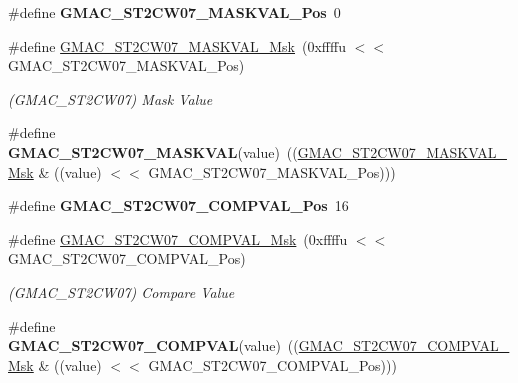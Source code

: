 \begin{DoxyCompactItemize}
\#define {\bfseries G\+M\+A\+C\+\_\+\+S\+T2\+C\+W07\+\_\+\+M\+A\+S\+K\+V\+A\+L\+\_\+\+Pos}~0
\item 
\mbox{\label{group__SAME70__GMAC_gaec7a742926e8d771dfb359cfc38959a0}} 
\#define \mbox{\hyperlink{group__SAME70__GMAC_gaec7a742926e8d771dfb359cfc38959a0}{G\+M\+A\+C\+\_\+\+S\+T2\+C\+W07\+\_\+\+M\+A\+S\+K\+V\+A\+L\+\_\+\+Msk}}~(0xffffu $<$$<$ G\+M\+A\+C\+\_\+\+S\+T2\+C\+W07\+\_\+\+M\+A\+S\+K\+V\+A\+L\+\_\+\+Pos)
\begin{DoxyCompactList}\small\item\em (G\+M\+A\+C\+\_\+\+S\+T2\+C\+W07) Mask Value \end{DoxyCompactList}\item 
\mbox{\label{group__SAME70__GMAC_ga1876c09ee0d84aaad328224e94017d7c}} 
\#define {\bfseries G\+M\+A\+C\+\_\+\+S\+T2\+C\+W07\+\_\+\+M\+A\+S\+K\+V\+AL}(value)~((\mbox{\hyperlink{group__SAMV71__GMAC_gaec7a742926e8d771dfb359cfc38959a0}{G\+M\+A\+C\+\_\+\+S\+T2\+C\+W07\+\_\+\+M\+A\+S\+K\+V\+A\+L\+\_\+\+Msk}} \& ((value) $<$$<$ G\+M\+A\+C\+\_\+\+S\+T2\+C\+W07\+\_\+\+M\+A\+S\+K\+V\+A\+L\+\_\+\+Pos)))
\item 
\mbox{\label{group__SAME70__GMAC_ga63575858b821e5f96b9bb9febdc6f985}} 
\#define {\bfseries G\+M\+A\+C\+\_\+\+S\+T2\+C\+W07\+\_\+\+C\+O\+M\+P\+V\+A\+L\+\_\+\+Pos}~16
\item 
\mbox{\label{group__SAME70__GMAC_gab5f156a21dbc6f907c6b3be164e1f864}} 
\#define \mbox{\hyperlink{group__SAME70__GMAC_gab5f156a21dbc6f907c6b3be164e1f864}{G\+M\+A\+C\+\_\+\+S\+T2\+C\+W07\+\_\+\+C\+O\+M\+P\+V\+A\+L\+\_\+\+Msk}}~(0xffffu $<$$<$ G\+M\+A\+C\+\_\+\+S\+T2\+C\+W07\+\_\+\+C\+O\+M\+P\+V\+A\+L\+\_\+\+Pos)
\begin{DoxyCompactList}\small\item\em (G\+M\+A\+C\+\_\+\+S\+T2\+C\+W07) Compare Value \end{DoxyCompactList}\item 
\mbox{\label{group__SAME70__GMAC_ga73f9a5625c444e22c8cc7b2302bb8069}} 
\#define {\bfseries G\+M\+A\+C\+\_\+\+S\+T2\+C\+W07\+\_\+\+C\+O\+M\+P\+V\+AL}(value)~((\mbox{\hyperlink{group__SAMV71__GMAC_gab5f156a21dbc6f907c6b3be164e1f864}{G\+M\+A\+C\+\_\+\+S\+T2\+C\+W07\+\_\+\+C\+O\+M\+P\+V\+A\+L\+\_\+\+Msk}} \& ((value) $<$$<$ G\+M\+A\+C\+\_\+\+S\+T2\+C\+W07\+\_\+\+C\+O\+M\+P\+V\+A\+L\+\_\+\+Pos)))

\end{DoxyCompactItemize}
